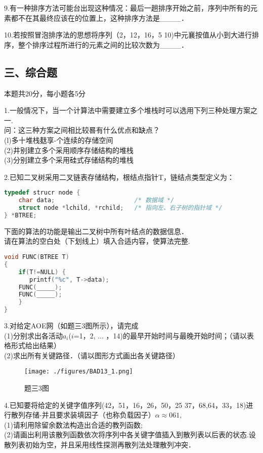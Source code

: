 9.有一种排序方法可能台出现这种情况：最后一趟排序开始之前，序列中所有的元素都不在其最终应该在的位置上，这种排序方法是____．

10.若按照冒泡排序法的思想将序列（2，12，16，5 10)中元襄按值从小到大进行排序，整个排序过程所进行的元素之间的比较次数为____．

\subsection{三、综合题}

本题共20分，每小题各5分

1.一般情况下，当一个计算法中需要建立多个堆栈时可以选用下列三种处理方案之一. \\
问：这三种方案之间相比较晷有什么优点和缺点？ \\
(l)多十堆栈麸享-个连续的存储空间 \\
(2)井别建立多个采用顺序存储结构的堆栈 \\
(3)分别建立多个采用硅式存储结构的堆栈

2.已知二叉树采用二叉链表存储结构，根结点指针T，链结点类型定义为： \\
\begin{lstlisting}[language=cpp]
typedef strucr node {
    char data;                      /* 数据域 */
    struct node *lchild, *rchild;   /* 指向左、右子树的指针域 */
} *BTREE;
\end{lstlisting}
下面的算法的功能是输出二叉树中所有叶结点的数据信息． \\
请在算法的空白处（下划线上）填入合适内容，使算法完整.
\begin{lstlisting}[language=cpp]
void FUNC(BTREE T)
{
    if(T!=NULL) {
       printf("%c", T->data);
    FUNC(_____);
    FUNC(_____);
    }
}
\end{lstlisting}

3.对给定AOE网（如题三3图所示），请完成 \\
(1)分别求出各活动$a_i$($i$=1，2, ... ，14)的最早开始时间与最晚开始时间；（请以表格形式给出结果） \\
(2)求出所有关键路径．（请以图形方式画出各关键路径）
\begin{figure}[ht]
\centering
\texttt{[image: ./figures/BAD13\_1.png]}
\caption{题三3图} \label{BAD13_fig1}
\end{figure}
4.已知要将给定的关键字值序列(42，51，16，26，50，25 37，68,64，33，18)进行散列存储-并且要求装填因子（也称负载因子）$\alpha\approx061$, \\
(1)请利用除留余数法构造出合适的教列函数; \\
(2)请画出利用该散列函数依次将序列中各关键字值插入到散列表以后表的状态.设散列表初始为空，并且采用线性探测再散列法处理散列冲突．


